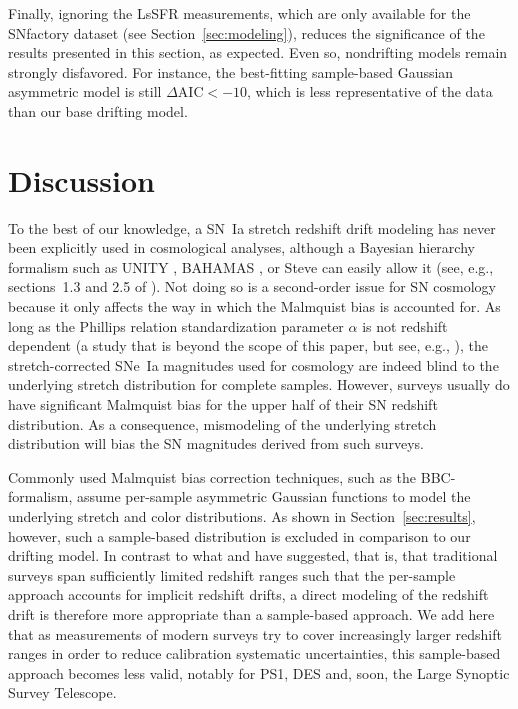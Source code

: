 \documentclass[]{aa}
\begin{document}
Finally, ignoring the LsSFR measurements, which are only available for the
SNfactory dataset (see Section~\ref{sec:modeling}), reduces the significance of
the results presented in this section, as expected. Even so, nondrifting models
remain strongly disfavored. For instance, the best-fitting sample-based Gaussian
asymmetric model is still $\Delta\mathrm{AIC}<-10$, which is less representative
of the data than our base drifting model.

\section{Discussion}\label{sec:discussion}

To the best of our knowledge, a SN~Ia stretch redshift drift modeling has never
been explicitly used in cosmological analyses, although a Bayesian hierarchy
formalism such as UNITY \citep{rubin2015}, BAHAMAS \citep{shariff2016}, or Steve
\citep{hinton2019} can easily allow it (see, e.g., sections~1.3 and 2.5 of
\cite{rubin2015}). Not doing so is a second-order issue for SN cosmology because
it only affects the way in which the Malmquist bias is accounted for. As long as
the Phillips relation \citep{phillips1993} standardization parameter $\alpha$ is
not redshift dependent (a study that is beyond the scope of this paper, but see,
e.g., \citealt{scolnic2018a}), the stretch-corrected SNe~Ia magnitudes used for
cosmology are indeed blind to the underlying stretch distribution for complete
samples. However, surveys usually do have significant Malmquist bias for the
upper half of their SN redshift distribution. As a consequence, mismodeling of
the underlying stretch distribution will bias the SN magnitudes derived from
such surveys. 

Commonly used Malmquist bias correction techniques, such as the BBC-formalism,
assume per-sample asymmetric Gaussian functions to model the underlying stretch
and color distributions. As shown in Section~\ref{sec:results}, however, such a
sample-based distribution is excluded in comparison to our drifting model. In
contrast to what \citet[][Section~2]{scolnic2016} and
\citet[][Section~5.4]{scolnic2018a} have suggested, that is, that traditional
surveys span sufficiently limited redshift ranges such that the per-sample
approach accounts for implicit redshift drifts, a direct modeling of the
redshift drift is therefore more appropriate than a sample-based approach. We
add here that as measurements of modern surveys try to cover increasingly larger
redshift ranges in order to reduce calibration systematic uncertainties, this
sample-based approach becomes less valid, notably for PS1, DES and, soon, the
Large Synoptic Survey Telescope.
\end{document}
